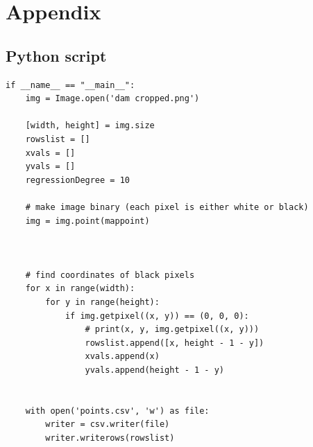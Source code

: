 \documentclass[a4paper]{article}
\theoremstyle{definition}
\begin{document}
\newpage

\section{Appendix}

    \subsection{Python script}\label{secPythonMakeCoordinates}
    \begin{verbatim}
if __name__ == "__main__":
    img = Image.open('dam cropped.png')

    [width, height] = img.size
    rowslist = []
    xvals = []
    yvals = []
    regressionDegree = 10

    # make image binary (each pixel is either white or black)
    img = img.point(mappoint)



    # find coordinates of black pixels
    for x in range(width):
        for y in range(height):
            if img.getpixel((x, y)) == (0, 0, 0):
                # print(x, y, img.getpixel((x, y)))
                rowslist.append([x, height - 1 - y])
                xvals.append(x)
                yvals.append(height - 1 - y)


    with open('points.csv', 'w') as file:
        writer = csv.writer(file)
        writer.writerows(rowslist)
    \end{verbatim}
\end{document}
